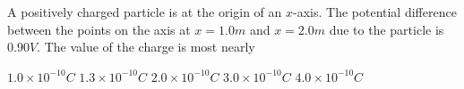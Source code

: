 \begin{questions}\setcounter{question}{30}\question
A positively charged particle is at the origin of an $x$-axis. The potential difference between the points on the axis at $x=1.0 \unit{m}$ and $x=2.0 \unit{m}$ due to the particle is $0.90 \unit{V}$. The value of the charge is most nearly

\begin{choices}
\choice $1.0 \times 10^{-10} \unit{C}$
\choice $1.3 \times 10^{-10} \unit{C}$
\choice $2.0 \times 10^{-10} \unit{C}$
\choice $3.0 \times 10^{-10} \unit{C}$
\choice $4.0 \times 10^{-10} \unit{C}$
\end{choices}\end{questions}

